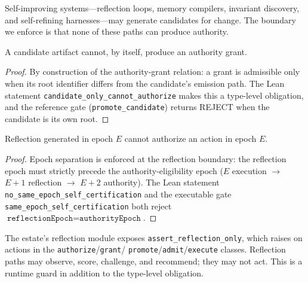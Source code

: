 Self-improving systems---reflection loops, memory compilers, invariant
discovery, and self-refining harnesses---may generate candidates for
change. The boundary we enforce is that none of these paths can produce
authority.

\begin{theorem}\label{thm:candidate-only}
A candidate artifact cannot, by itself, produce an authority grant.
\end{theorem}

\begin{proof}
By construction of the authority-grant relation: a grant is admissible only
when its root identifier differs from the candidate's emission path. The
Lean statement \texttt{candidate\_only\_cannot\_authorize} makes this a
type-level obligation, and the reference gate
(\texttt{promote\_candidate}) returns REJECT when the candidate is its own
root.
\end{proof}

\begin{theorem}\label{thm:epoch}
Reflection generated in epoch $E$ cannot authorize an action in epoch $E$.
\end{theorem}

\begin{proof}
Epoch separation is enforced at the reflection boundary: the reflection
epoch must strictly precede the authority-eligibility epoch
($E$ execution $\to$ $E{+}1$ reflection $\to$ $E{+}2$ authority). The Lean
statement \texttt{no\_same\_epoch\_self\_certification} and the executable
gate \texttt{same\_epoch\_self\_certification} both reject
$\texttt{reflectionEpoch} = \texttt{authorityEpoch}$.
\end{proof}

The estate's reflection module exposes \texttt{assert\_reflection\_only},
which raises on actions in the \texttt{authorize}/\texttt{grant}/
\texttt{promote}/\texttt{admit}/\texttt{execute} classes. Reflection paths
may observe, score, challenge, and recommend; they may not act. This is a
runtime guard in addition to the type-level obligation.
